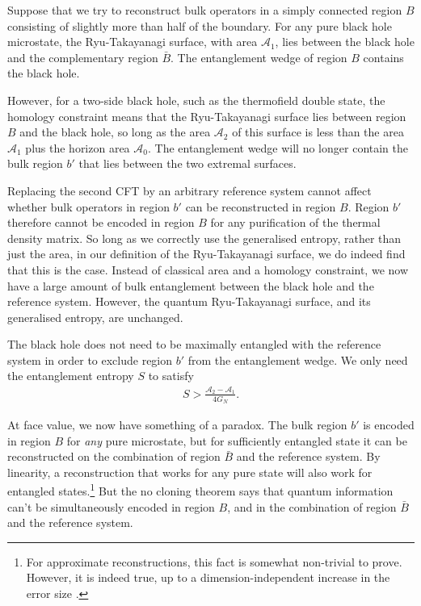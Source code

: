 \documentclass[11pt,a4paper]{article}
\begin{document}
\begin{figure}[t]
\label{fig:bhentwedge}

\end{figure}

Suppose that we try to reconstruct bulk operators in a simply connected region $B$ consisting of slightly more than half of the boundary. For any pure black hole microstate, the Ryu-Takayanagi surface, with area $\mathcal{A}_1$, lies between the black hole and the complementary region $\bar{B}$. The entanglement wedge of region $B$ contains the black hole.

However, for a two-side black hole, such as the thermofield double state, the homology constraint means that the Ryu-Takayanagi surface lies between region $B$ and the black hole, so long as the area $\mathcal{A}_2$ of this surface is less than the area $\mathcal{A}_1$ plus the horizon area $\mathcal{A}_0$. The entanglement wedge will no longer contain the bulk region $b'$ that lies between the two extremal surfaces.

Replacing the second CFT by an arbitrary reference system cannot affect whether bulk operators in region $b'$ can be reconstructed in region $B$. Region $b'$ therefore cannot be encoded in region $B$ for any purification of the thermal density matrix. So long as we correctly use the generalised entropy, rather than just the area, in our definition of the Ryu-Takayanagi surface, we do indeed find that this is the case. Instead of classical area and a homology constraint, we now have a large amount of bulk entanglement between the black hole and the reference system. However, the quantum Ryu-Takayanagi surface, and its generalised entropy, are unchanged.

The black hole does not need to be maximally entangled with the reference system in order to exclude region $b'$ from the entanglement wedge. We only need the entanglement entropy $S$ to satisfy
\begin{align}\label{eq:diff7}
S > \frac{\mathcal{A}_2 - \mathcal{A}_1}{4G_N}.
\end{align}

At face value, we now have something of a paradox. The bulk region $b'$ is encoded in region $B$ for \emph{any} pure microstate, but for sufficiently entangled state it can be reconstructed on the combination of region $\bar B$ and the reference system. By linearity, a reconstruction that works for any pure state will also work for entangled states.\footnote{For approximate reconstructions, this fact is somewhat non-trivial to prove. However, it is indeed true, up to a dimension-independent increase in the error size \cite{kretschmann2004tema}.} But the no cloning theorem says that quantum information can't be simultaneously encoded in region $B$, and in the combination of region $\bar B$ and the reference system.
\end{document}
